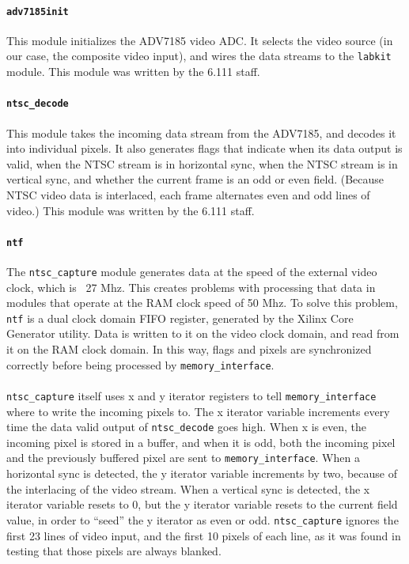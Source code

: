 \documentclass[10pt]{article}
\begin{document}
\paragraph{{\tt adv7185init}} This module initializes the ADV7185 video ADC. It selects the video source (in our case, the composite video input), and wires the data streams to the {\tt labkit} module. This module was written by the 6.111 staff.

\paragraph{{\tt ntsc\_decode}} This module takes the incoming data stream from the ADV7185, and decodes it into individual pixels. It also generates flags that indicate when its data output is valid, when the NTSC stream is in horizontal sync, when the NTSC stream is in vertical sync, and whether the current frame is an odd or even field. (Because NTSC video data is interlaced, each frame alternates even and odd lines of video.) This module was written by the 6.111 staff.

\paragraph{{\tt ntf}} The {\tt ntsc\_capture} module generates data at the speed of the external video clock, which is ~27 Mhz. This creates problems with processing that data in modules that operate at the RAM clock speed of 50 Mhz. To solve this problem, {\tt ntf} is a dual clock domain FIFO register, generated by the Xilinx Core Generator utility. Data is written to it on the video clock domain, and read from it on the RAM clock domain. In this way, flags and pixels are synchronized correctly before being processed by {\tt memory\_interface}.

\paragraph{} {\tt ntsc\_capture} itself uses x and y iterator registers to tell {\tt memory\_interface} where to write the incoming pixels to. The x iterator variable increments every time the data valid output of {\tt ntsc\_decode} goes high. When x is even, the incoming pixel is stored in a buffer, and when it is odd, both the incoming pixel and the previously buffered pixel are sent to {\tt memory\_interface}. When a horizontal sync is detected, the y iterator variable increments by two, because of the interlacing of the video stream. When a vertical sync is detected, the x iterator variable resets to 0, but the y iterator variable resets to  the current field value, in order to ``seed'' the y iterator as even or odd. {\tt ntsc\_capture} ignores the first 23 lines of video input, and the first 10 pixels of each line, as it was found in testing that those pixels are always blanked.
\end{document}
